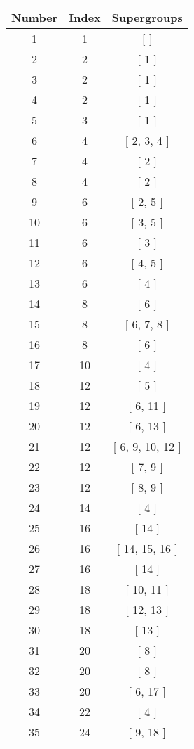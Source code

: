 \begin{center}
\begin{longtable}[H]{|| c c c ||}
\hline
Number & Index & Supergroups \\ 
\hline
1 & 1 & [ ] \\ 
\hline
2 & 2 & [ 1 ] \\ 
\hline
3 & 2 & [ 1 ] \\ 
\hline
4 & 2 & [ 1 ] \\ 
\hline
5 & 3 & [ 1 ] \\ 
\hline
6 & 4 & [ 2, 3, 4 ] \\ 
\hline
7 & 4 & [ 2 ] \\ 
\hline
8 & 4 & [ 2 ] \\ 
\hline
9 & 6 & [ 2, 5 ] \\ 
\hline
10 & 6 & [ 3, 5 ] \\ 
\hline
11 & 6 & [ 3 ] \\ 
\hline
12 & 6 & [ 4, 5 ] \\ 
\hline
13 & 6 & [ 4 ] \\ 
\hline
14 & 8 & [ 6 ] \\ 
\hline
15 & 8 & [ 6, 7, 8 ] \\ 
\hline
16 & 8 & [ 6 ] \\ 
\hline
17 & 10 & [ 4 ] \\ 
\hline
18 & 12 & [ 5 ] \\ 
\hline
19 & 12 & [ 6, 11 ] \\ 
\hline
20 & 12 & [ 6, 13 ] \\ 
\hline
21 & 12 & [ 6, 9, 10, 12 ] \\ 
\hline
22 & 12 & [ 7, 9 ] \\ 
\hline
23 & 12 & [ 8, 9 ] \\ 
\hline
24 & 14 & [ 4 ] \\ 
\hline
25 & 16 & [ 14 ] \\ 
\hline
26 & 16 & [ 14, 15, 16 ] \\ 
\hline
27 & 16 & [ 14 ] \\ 
\hline
28 & 18 & [ 10, 11 ] \\ 
\hline
29 & 18 & [ 12, 13 ] \\ 
\hline
30 & 18 & [ 13 ] \\ 
\hline
31 & 20 & [ 8 ] \\ 
\hline
32 & 20 & [ 8 ] \\ 
\hline
33 & 20 & [ 6, 17 ] \\ 
\hline
34 & 22 & [ 4 ] \\ 
\hline
35 & 24 & [ 9, 18 ] \\ 

\end{longtable}
\end{center}
